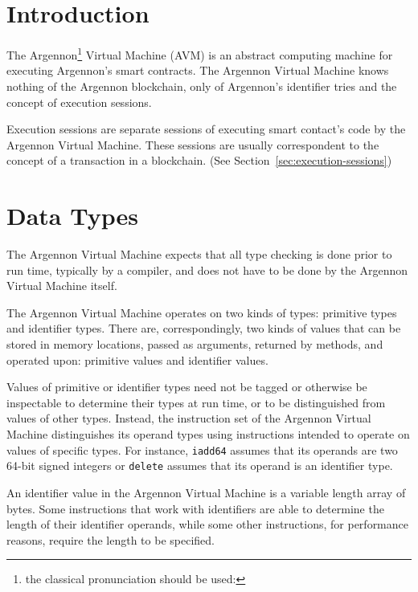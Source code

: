 

\section{Introduction}\label{sec:introduction}

The Argennon\footnote{the classical pronunciation should be used:} Virtual Machine (AVM) is an
abstract computing machine for executing Argennon's smart contracts. The
Argennon Virtual Machine knows nothing of the Argennon blockchain, only of Argennon's identifier tries and
the concept of execution sessions.

Execution sessions are separate sessions of executing smart contact's code by the Argennon Virtual Machine.
These sessions are usually correspondent to the concept of a transaction in a blockchain. (See
Section~\ref{sec:execution-sessions})


\section{Data Types}\label{sec:data-types}

The Argennon Virtual Machine expects that all type checking is done prior to run time, typically by a compiler,
and does not have to be done by the Argennon Virtual Machine itself.

The Argennon Virtual Machine operates on two kinds of types: primitive types and identifier types. There are,
correspondingly, two kinds of values that can be stored in memory locations, passed as arguments, returned by
methods, and operated upon: primitive values and identifier values.

Values of primitive or identifier types need not be tagged or otherwise be inspectable to determine their types
at run time, or to be distinguished from values of other types. Instead, the instruction set of the Argennon
Virtual Machine distinguishes its operand types using instructions intended to operate on values of specific
types. For instance, \texttt{iadd64} assumes that its operands are two 64-bit signed integers or \texttt{delete}
assumes that its operand is an identifier type.

An identifier value in the Argennon Virtual Machine is a variable length array of bytes. Some instructions
that work with identifiers are able to determine the length of their identifier operands, while some
other instructions, for performance reasons, require the length to be specified.

